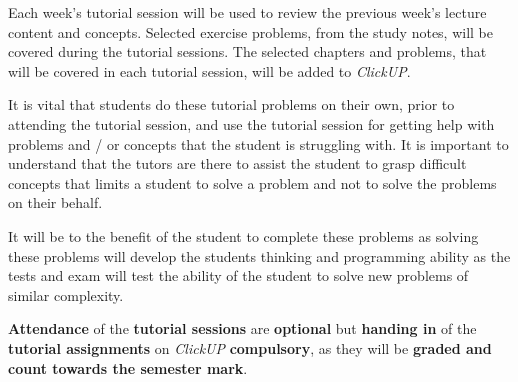         Each week's tutorial session will be used to review the
        previous week's lecture content and concepts. Selected
        exercise problems, from the study notes, will be covered
        during the tutorial sessions. The selected chapters and
        problems, that will be covered in each tutorial session, will
        be added to {\it ClickUP}.

        It is vital that students do these tutorial problems on their
        own, prior to attending the tutorial session, and use the
        tutorial session for getting help with problems and / or
        concepts that the student is struggling with. It is important
        to understand that the tutors are there to assist the student
        to grasp difficult concepts that limits a student to solve a
        problem and not to solve the problems on their behalf.

        It will be to the benefit of the student to complete these
        problems as solving these problems will develop the students
        thinking and programming ability as the tests and exam will
        test the ability of the student to solve new problems of
        similar complexity.

        \textbf{Attendance} of the \textbf{tutorial sessions}
        are \textbf{optional} but \textbf{handing in} of the
        \textbf{tutorial assignments} on {\it ClickUP}
        \textbf{compulsory}, as they will be \textbf{graded and count
        towards the semester mark}.
